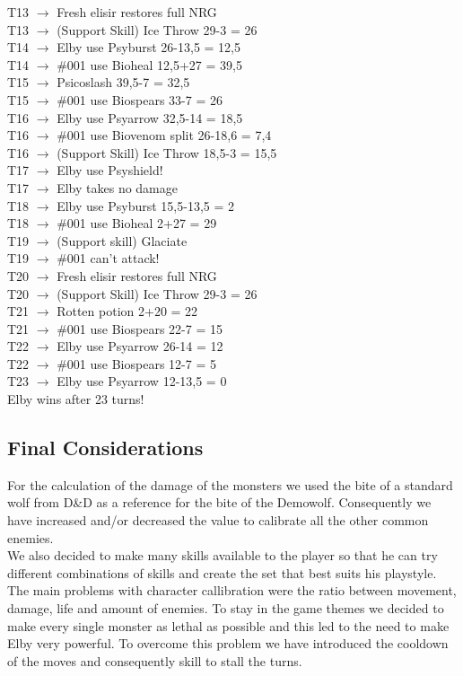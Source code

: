 T13 $\rightarrow$ Fresh elisir restores full NRG\\
T13 $\rightarrow$ (Support Skill) Ice Throw 29-3 = 26\\
T14 $\rightarrow$ Elby use Psyburst 26-13,5 = 12,5\\
T14 $\rightarrow$ \#001 use Bioheal 12,5+27 = 39,5\\
T15 $\rightarrow$ Psicoslash 39,5-7 = 32,5\\
T15 $\rightarrow$ \#001 use Biospears 33-7 = 26\\
T16 $\rightarrow$ Elby use Psyarrow 32,5-14 = 18,5\\
T16 $\rightarrow$ \#001 use Biovenom split 26-18,6 = 7,4\\
T16 $\rightarrow$ (Support Skill) Ice Throw 18,5-3 = 15,5\\
T17 $\rightarrow$ Elby use Psyshield!\\
T17 $\rightarrow$ Elby takes no damage\\
T18 $\rightarrow$ Elby use Psyburst 15,5-13,5 = 2\\
T18 $\rightarrow$ \#001 use Bioheal 2+27 = 29\\
T19 $\rightarrow$ (Support skill) Glaciate\\
T19 $\rightarrow$ \#001 can't attack!\\
T20 $\rightarrow$ Fresh elisir restores full NRG\\
T20 $\rightarrow$ (Support Skill) Ice Throw 29-3 = 26\\
T21 $\rightarrow$ Rotten potion 2+20 = 22\\
T21 $\rightarrow$ \#001 use Biospears 22-7 = 15\\
T22 $\rightarrow$ Elby use Psyarrow 26-14 = 12\\
T22 $\rightarrow$ \#001 use Biospears 12-7 = 5\\
T23 $\rightarrow$ Elby use Psyarrow 12-13,5 = 0\\
Elby wins after 23 turns!


\subsection{Final Considerations}
For the calculation of the damage of the monsters we used the bite of a standard wolf from D\&D as a reference for the bite of the Demowolf. Consequently we have increased and/or decreased the value to calibrate all the other common enemies.\\
We also decided to make many skills available to the player so that he can try different combinations of skills and create the set that best suits his playstyle.\\
The main problems with character callibration were the ratio between movement, damage, life and amount of enemies. To stay in the game themes we decided to make every single monster as lethal as possible and this led to the need to make Elby very powerful. To overcome this problem we have introduced the cooldown of the moves and consequently skill to stall the turns.
